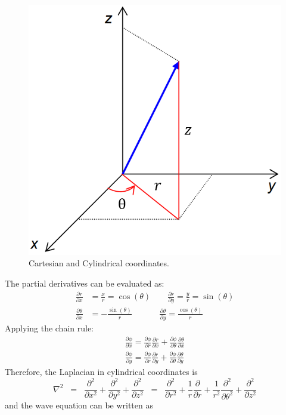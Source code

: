 \documentclass{homework}
\begin{document}
\begin{figure}[h]
    \begin{center}
    \includegraphics[scale = 0.25]{media/Cylindrical-Coordinates.png}
    \caption{Cartesian and Cylindrical coordinates.}
    \end{center}
\end{figure}
\noindent
The partial derivatives can be evaluated as:
\begin{align*}
\frac{\partial r}{\partial x} &= \frac{x}{r} = \cos(\theta) \qquad \frac{\partial r}{\partial y} = \frac{y}{r} = \sin(\theta) \\
\frac{\partial \theta}{\partial x} &= -\frac{\sin(\theta)}{r} \qquad \quad \; \frac{\partial \theta}{\partial y} = \frac{\cos(\theta)}{r}
\end{align*}
Applying the chain rule:
\begin{align*}
\frac{\partial \phi}{\partial x} = \frac{\partial \phi}{\partial r} \frac{\partial r}{\partial x} + \frac{\partial \phi}{\partial \theta} \frac{\partial \theta}{\partial x}\\
\frac{\partial \phi}{\partial y} = \frac{\partial \phi}{\partial r} \frac{\partial r}{\partial y} + \frac{\partial \phi}{\partial \theta} \frac{\partial \theta}{\partial y}
\end{align*}
Therefore, the Laplacian in cylindrical coordinates is
\[ \nabla^2 \;\; = \;\; \frac{\partial^2}{\partial x^2} + \frac{\partial^2}{\partial y^2} + \frac{\partial^2}{\partial z^2} \;\; = \;\; \frac{\partial^2}{\partial r^2} + \frac{1}{r} \frac{\partial}{\partial r} + \frac{1}{r^2} \frac{\partial^2}{\partial \theta^2} + \frac{\partial^2}{\partial z^2} \]
\noindent
and the wave equation can be written as
\end{document}
